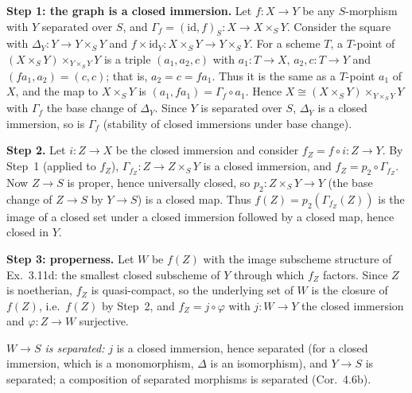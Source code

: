 \documentclass[11pt]{article}
\begin{document}
\pf
\textbf{Step 1: the graph is a closed immersion.} Let $f:X\to Y$ be any $S$-morphism with $Y$ separated over $S$, and $\Gamma_f=(\mathrm{id},f)_S:X\to X\times_SY$. Consider the square with $\Delta_Y:Y\to Y\times_SY$ and $f\times\mathrm{id}_Y:X\times_SY\to Y\times_SY$. For a scheme $T$, a $T$-point of $(X\times_SY)\times_{Y\times_SY}Y$ is a triple $(a_1,a_2,c)$ with $a_1:T\to X$, $a_2,c:T\to Y$ and $(fa_1,a_2)=(c,c)$; that is, $a_2=c=fa_1$. Thus it is the same as a $T$-point $a_1$ of $X$, and the map to $X\times_SY$ is $(a_1,fa_1)=\Gamma_f\circ a_1$. Hence $X\cong(X\times_SY)\times_{Y\times_SY}Y$ with $\Gamma_f$ the base change of $\Delta_Y$. Since $Y$ is separated over $S$, $\Delta_Y$ is a closed immersion, so is $\Gamma_f$ (stability of closed immersions under base change).

\textbf{Step 2.} Let $i:Z\to X$ be the closed immersion and consider $f_Z=f\circ i:Z\to Y$. By Step~1 (applied to $f_Z$), $\Gamma_{f_Z}:Z\to Z\times_SY$ is a closed immersion, and $f_Z=p_2\circ\Gamma_{f_Z}$. Now $Z\to S$ is proper, hence universally closed, so $p_2:Z\times_SY\to Y$ (the base change of $Z\to S$ by $Y\to S$) is a closed map. Thus $f(Z)=p_2(\Gamma_{f_Z}(Z))$ is the image of a closed set under a closed immersion followed by a closed map, hence closed in $Y$.

\textbf{Step 3: properness.} Let $W$ be $f(Z)$ with the image subscheme structure of Ex.~3.11d: the smallest closed subscheme of $Y$ through which $f_Z$ factors. Since $Z$ is noetherian, $f_Z$ is quasi-compact, so the underlying set of $W$ is the closure of $f(Z)$, i.e.\ $f(Z)$ by Step~2, and $f_Z=j\circ\varphi$ with $j:W\to Y$ the closed immersion and $\varphi:Z\to W$ surjective.

\emph{$W\to S$ is separated:} $j$ is a closed immersion, hence separated (for a closed immersion, which is a monomorphism, $\Delta$ is an isomorphism), and $Y\to S$ is separated; a composition of separated morphisms is separated (Cor.~4.6b).
\end{document}
